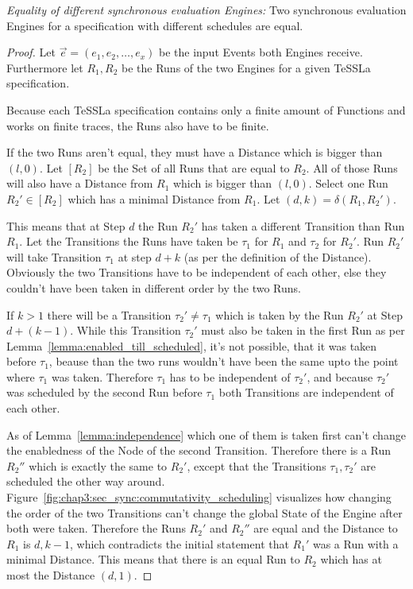 \begin{theorem}
  \emph{Equality of different synchronous evaluation Engines:} Two synchronous evaluation Engines for a specification with different schedules are equal.
\label{theorem:equal_sync_eval_engines}
\end{theorem}
\begin{proof}

Let \(\vec{e} = (e_1, e_2, \dots, e_x)\) be the input Events both Engines receive.
Furthermore let \(R_1, R_2\) be the Runs of the two Engines for a given TeSSLa specification.

Because each TeSSLa specification contains only a finite amount of Functions and works on finite traces, the Runs also have to be finite.

If the two Runs aren't equal, they must have a Distance which is bigger than \((l, 0)\).
Let \([R_2]\) be the Set of all Runs that are equal to \(R_2\).
All of those Runs will also have a Distance from \(R_1\) which is bigger than \((l, 0)\).
Select one Run \(R_2' \in [R_2]\) which has a minimal Distance from \(R_1\).
Let \((d,k) = \delta(R_1, R_2')\).

This means that at Step \(d\) the Run \(R_2'\) has taken a different Transition than Run \(R_1\).
Let the Transitions the Runs have taken be \(\tau_1\) for \(R_1\) and \(\tau_2\) for \(R_2'\).
Run \(R_2'\) will take Transition \(\tau_1\) at step \(d+k\) (as per the definition of the Distance).
Obviously the two Transitions have to be independent of each other, else they couldn't have been taken in different order by the two Runs.

If \(k > 1\) there will be a Transition \(\tau_2' \neq \tau_1\) which is taken by the Run \(R_2'\) at Step \(d+(k-1)\).
While this Transition \(\tau_2'\) must also be taken in the first Run as per Lemma~\ref{lemma:enabled_till_scheduled}, it's not possible, that it was taken before \(\tau_1\), beause than the two runs wouldn't have been the same upto the point where \(\tau_1\) was taken.
Therefore \(\tau_1\) has to be independent of \(\tau_2'\), and because \(\tau_2'\) was scheduled by the second Run before \(\tau_1\) both Transitions are independent of each other.

As of Lemma~\ref{lemma:independence} which one of them is taken first can't change the enabledness of the Node of the second Transition.
Therefore there is a Run \(R_2''\) which is exactly the same to \(R_2'\), except that the Transitions \(\tau_1, \tau_2'\) are scheduled the other way around.
Figure~\ref{fig:chap3:sec_sync:commutativity_scheduling} visualizes how changing the order of the two Transitions can't change the global State of the Engine after both were taken.
Therefore the Runs \(R_2'\) and \(R_2''\) are equal and the Distance to \(R_1\) is \(d, k-1\), which contradicts the initial statement that \(R_1'\) was a Run with a minimal Distance.
This means that there is an equal Run to \(R_2\) which has at most the Distance \((d, 1)\).


\end{proof}
